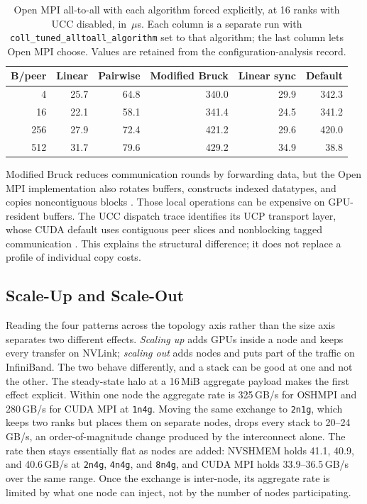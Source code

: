 \begin{table}[htbp]
\centering
\caption{Open MPI all-to-all with each algorithm forced explicitly, at 16 ranks with UCC disabled, in \,$\mu$s. Each column is a separate run with \texttt{coll\_tuned\_alltoall\_algorithm} set to that algorithm; the last column lets Open MPI choose. Values are retained from the configuration-analysis record.}
\label{tab:m-alltoall-forced}
\scriptsize
\begin{tabular}{rrrrrr}
\toprule
B/peer & Linear & Pairwise & Modified Bruck & Linear sync & Default\\
\midrule
4 & 25.7 & 64.8 & 340.0 & 29.9 & 342.3\\
16 & 22.1 & 58.1 & 341.4 & 24.5 & 341.2\\
256 & 27.9 & 72.4 & 421.2 & 29.6 & 420.0\\
512 & 31.7 & 79.6 & 429.2 & 34.9 & 38.8\\
\bottomrule
\end{tabular}
\end{table}

Modified Bruck reduces communication rounds by forwarding data, but the Open MPI implementation also rotates buffers, constructs indexed datatypes, and copies noncontiguous blocks \cite{bruck_alltoall_1997,openmpi_alltoall_source_2026}. Those local operations can be expensive on GPU-resident buffers. The UCC dispatch trace identifies its UCP transport layer, whose CUDA default uses contiguous peer slices and nonblocking tagged communication \cite{venkata_ucc_2024,openucx_ucc_source_2026}. This explains the structural difference; it does not replace a profile of individual copy costs.

\subsection{Scale-Up and Scale-Out}\label{sec:micro-scaling}

Reading the four patterns across the topology axis rather than the size axis separates two different effects. \emph{Scaling up} adds GPUs inside a node and keeps every transfer on NVLink; \emph{scaling out} adds nodes and puts part of the traffic on InfiniBand. The two behave differently, and a stack can be good at one and not the other. The steady-state halo at a 16\,MiB aggregate payload makes the first effect explicit. Within one node the aggregate rate is 325\,GB/s for OSHMPI and 280\,GB/s for CUDA MPI at \texttt{1n4g}. Moving the same exchange to \texttt{2n1g}, which keeps two ranks but places them on separate nodes, drops every stack to 20--24\,GB/s, an order-of-magnitude change produced by the interconnect alone. The rate then stays essentially flat as nodes are added: NVSHMEM holds 41.1, 40.9, and 40.6\,GB/s at \texttt{2n4g}, \texttt{4n4g}, and \texttt{8n4g}, and CUDA MPI holds 33.9--36.5\,GB/s over the same range. Once the exchange is inter-node, its aggregate rate is limited by what one node can inject, not by the number of nodes participating.

